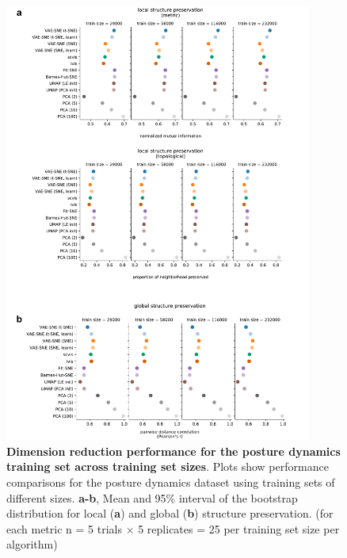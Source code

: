 \begin{figure}[!htb]
\centering
\includegraphics[width=0.9\textwidth]{Graving_IMPRS_Thesis/figures/training_set_appendix_figure.pdf}

\caption{  \textbf{Dimension reduction performance for the posture dynamics training set across training set sizes}. Plots show performance comparisons for the posture dynamics dataset \citep{berman2014mapping, berman2016predictability, pereira2019fast} using training sets of different sizes. \textbf{a-b}, Mean and 95\% interval of the bootstrap distribution for local (\textbf{a}) and global (\textbf{b}) structure preservation. (for each metric n = 5 trials $\times$ 5 replicates = 25 per training set size per algorithm)}

\label{fig:training_set_appendix_figure} %

\end{figure}



